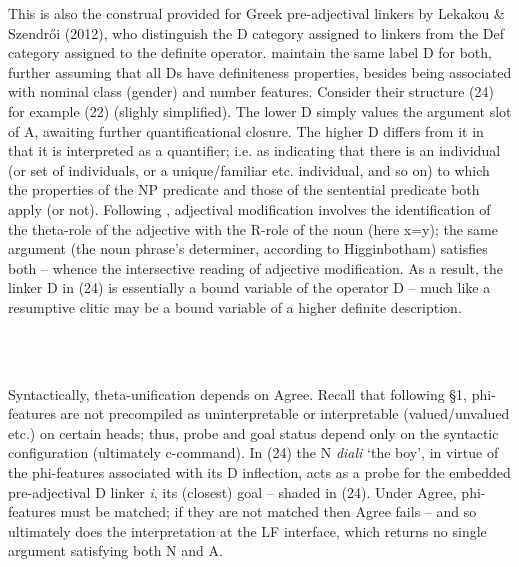 \documentclass[output=paper]{langsci/langscibook}
\begin{document}
 
\begin{styleSfondomedioiColorexi}
This is also the construal provided for Greek pre-adjectival linkers by Lekakou \& Szendrői (2012), who distinguish the D category assigned to linkers from the Def category assigned to the definite operator. \citet{FrancoEtAl2015} maintain the same label D for both, further assuming that all Ds have definiteness properties, besides being associated with nominal class (gender) and number features. Consider their structure (24) for example (22) (slighly simplified). The lower D simply values the argument slot of A, awaiting further quantificational closure. The higher D differs from it in that it is interpreted as a quantifier; i.e. as indicating that there is an individual (or set of individuals, or a unique/familiar etc. individual, and so on) to which the properties of the NP predicate and those of the sentential predicate both apply (or not). Following \citet{Higginbotham1985}, adjectival modification involves the identification of the theta-role of the adjective with the R-role of the noun (here x=y); the same argument (the noun phrase’s determiner, according to Higginbotham) satisfies both – whence the intersective reading of adjective modification. As a result, the linker D in (24) is essentially a bound variable of the operator D – much like a resumptive clitic may be a bound variable of a higher definite description.
\end{styleSfondomedioiColorexi}

\begin{styleSfondomedioiColorexi}
\ea%
    \label{ex:key:24}
    \gll\\
        \\
    \glt
    \z

              
\end{styleSfondomedioiColorexi}

 
\begin{styleSfondomedioiColorexi}
Syntactically, theta-unification depends on Agree. Recall that following §1, phi-features are not precompiled as uninterpretable or interpretable (valued/unvalued etc.) on certain heads; thus, probe and goal status depend only on the syntactic configuration (ultimately c-command). In (24) the N \textit{diali} ‘the boy’, in virtue of the phi-features associated with its D inflection, acts as a probe for the embedded pre-adjectival D linker \textit{i}, its (closest) goal – shaded in (24). Under Agree, phi-features must be matched; if they are not matched then Agree fails – and so ultimately does the interpretation at the LF interface, which returns no single argument satisfying both N and A. 
\end{styleSfondomedioiColorexi}
\end{document}
